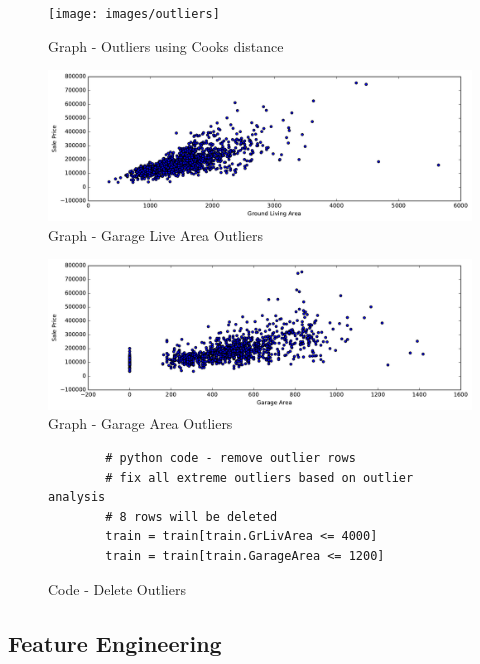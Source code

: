 \documentclass[sigconf]{acmart}
\begin{document}
	\begin{figure}[htb]
		\centering
		\texttt{[image: images/outliers]}	
		\caption{Graph - Outliers using Cooks distance} \label{fig:outliers} 
	\end{figure}
		
	\begin{figure}[htb]
	\centering
	\includegraphics[width=1.0\columnwidth]{images/gr_liv_area_outlier}	
	\caption{Graph - Garage Live Area Outliers} \label{fig:gr-liv-area-outlier} 
	\end{figure}

	\begin{figure}[htb]
	\centering
	\includegraphics[width=1.0\columnwidth]{images/garage_area_outlier}	
	\caption{Graph - Garage Area Outliers} \label{fig:garage-area-outlier} 
	\end{figure}

	\begin{figure}[htb]				
		\begin{verbatim}	
		# python code - remove outlier rows
		# fix all extreme outliers based on outlier analysis
		# 8 rows will be deleted
		train = train[train.GrLivArea <= 4000]
		train = train[train.GarageArea <= 1200]
		\end{verbatim}
		\caption{Code - Delete Outliers} \label{c:code-del-outliers} 
	\end{figure}

	\subsection{Feature Engineering}
	
\end{document}
